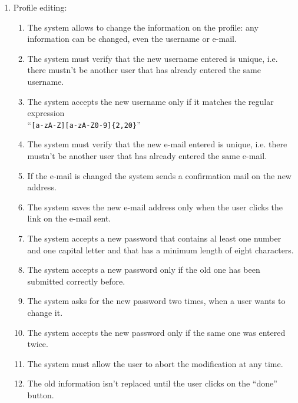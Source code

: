 \begin{enumerate}
\item Profile editing:
\begin{enumerate}
\item The system allows to change the information on the profile: any information can be changed, even the username or e-mail.
\item The system must verify that the new username entered is unique, i.e. there mustn't be another user that has already entered the same username.  \label{f-modify-usrn1}
\item  The system accepts the new username only if it matches the regular expression\\``\texttt{[a-zA-Z][a-zA-Z0-9]\{2,20\}}''   \label{f-modify-usrn2}
\item The system must verify that the new e-mail entered is unique, i.e. there mustn't be another user that has already entered the same e-mail.   \label{f-modify-mail1}
\item If the e-mail is changed the system sends a confirmation mail on the new address.
\item The system saves the new e-mail address only when the user clicks the link on the e-mail sent.   \label{f-modify-mail2}
\item The system accepts a new password that contains al least one number and one capital letter and that has a minimum length of eight characters.   \label{f-modify-pswd1}
\item The system accepts a new password only if the old one has been submitted correctly before.  \label{f-modify-pswd2}
\item The system asks for the new password two times, when a user wants to change it.
\item The system accepts the new password only if the same one was entered twice.  \label{f-modify-pswd3}
\item The system must allow the user to abort the modification at any time.
\item The old information isn't replaced until the user clicks on the ``done'' button.
\end{enumerate}
\end{enumerate}
